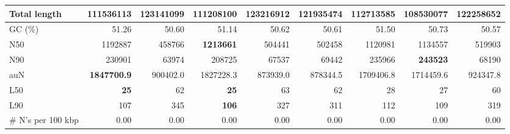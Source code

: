 \documentclass[12pt,a4paper]{article}
\begin{document}
\begin{table}[ht]
\begin{center}
\begin{tabular}{|l*{8}{|r}|}
Total length & 111536113 & 123141099 & 111208100 & {\bf 123216912} & 121935474 & 112713585 & 108530077 & 122258652 \\ \hline
GC (\%) & 51.26 & 50.60 & 51.14 & 50.62 & 50.61 & 51.50 & 50.73 & 50.57 \\ \hline
N50 & 1192887 & 458766 & {\bf 1213661} & 504441 & 502458 & 1120981 & 1134557 & 519903 \\ \hline
N90 & 230901 & 63974 & 208725 & 67537 & 69442 & 235966 & {\bf 243523} & 68190 \\ \hline
auN & {\bf 1847700.9} & 900402.0 & 1827228.3 & 873939.0 & 878344.5 & 1709406.8 & 1714459.6 & 924347.8 \\ \hline
L50 & {\bf 25} & 62 & {\bf 25} & 63 & 62 & 28 & 27 & 60 \\ \hline
L90 & 107 & 345 & {\bf 106} & 327 & 311 & 112 & 109 & 319 \\ \hline
\# N's per 100 kbp & 0.00 & 0.00 & 0.00 & 0.00 & 0.00 & 0.00 & 0.00 & 0.00 \\ \hline
\end{tabular}
\end{center}
\end{table}
\end{document}
